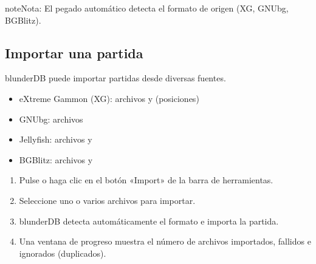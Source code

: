 \documentclass[letterpaper,10pt,spanish]{sphinxmanual}
\begin{document}
\begin{sphinxadmonition}{note}{Nota:}
\sphinxAtStartPar
El pegado automático detecta el formato de origen (XG, GNUbg, BGBlitz).
\end{sphinxadmonition}


\subsection{Importar una partida}
\label{\detokenize{guide_utilisateur:importer-un-match}}
\sphinxAtStartPar
blunderDB puede importar partidas desde diversas fuentes.

\sphinxAtStartPar
{}
\begin{itemize}
\item {} 
\sphinxAtStartPar
eXtreme Gammon (XG): archivos  y  (posiciones)

\item {} 
\sphinxAtStartPar
GNUbg: archivos 

\item {} 
\sphinxAtStartPar
Jellyfish: archivos  y 

\item {} 
\sphinxAtStartPar
BGBlitz: archivos  y 

\end{itemize}

\sphinxAtStartPar
{}
\begin{enumerate}
%
\item {} 
\sphinxAtStartPar
Pulse  o haga clic en el botón «Import» de la barra de herramientas.

\item {} 
\sphinxAtStartPar
Seleccione uno o varios archivos para importar.

\item {} 
\sphinxAtStartPar
blunderDB detecta automáticamente el formato e importa la partida.

\item {} 
\sphinxAtStartPar
Una ventana de progreso muestra el número de archivos importados, fallidos e ignorados (duplicados).

\end{enumerate}
\end{document}
